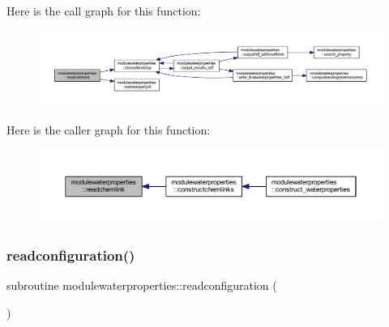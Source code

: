 Here is the call graph for this function\+:\nopagebreak
\begin{figure}[H]
\begin{center}
\leavevmode
\includegraphics[width=350pt]{namespacemodulewaterproperties_a9745c5b394a2c3fc11587bda05c362d6_cgraph}
\end{center}
\end{figure}
Here is the caller graph for this function\+:\nopagebreak
\begin{figure}[H]
\begin{center}
\leavevmode
\includegraphics[width=350pt]{namespacemodulewaterproperties_a9745c5b394a2c3fc11587bda05c362d6_icgraph}
\end{center}
\end{figure}
\mbox{\label{namespacemodulewaterproperties_abba5d253e1014bd117f71c0ea3a37d58}} 
\subsubsection{\texorpdfstring{readconfiguration()}{readconfiguration()}}
{\footnotesize\ttfamily subroutine modulewaterproperties\+::readconfiguration (\begin{DoxyParamCaption}{ }\end{DoxyParamCaption})\hspace{0.3cm}{\ttfamily [private]}}

